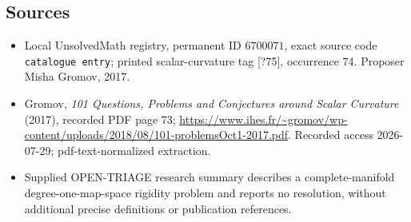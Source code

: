 \documentclass[11pt]{article}
\begin{document}
\subsection{Sources}
\begin{itemize}
\item Local UnsolvedMath registry, permanent ID \(6700071\), exact source code \texttt{catalogue entry}; printed scalar-curvature tag [?75], occurrence 74. Proposer Misha Gromov, 2017.
\item Gromov, \emph{101 Questions, Problems and Conjectures around Scalar Curvature} (2017), recorded PDF page 73; \url{https://www.ihes.fr/~gromov/wp-content/uploads/2018/08/101-problemsOct1-2017.pdf}. Recorded access 2026-07-29; pdf-text-normalized extraction.
\item Supplied OPEN-TRIAGE research summary describes a complete-manifold degree-one-map-space rigidity problem and reports no resolution, without additional precise definitions or publication references.
\end{itemize}
\end{document}
